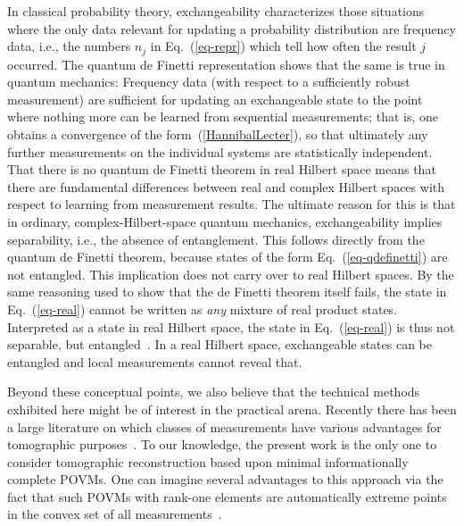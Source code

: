In classical probability theory, exchangeability characterizes
those situations where the only data relevant for updating a
probability distribution are frequency data, i.e., the numbers
$n_j$ in Eq.~(\ref{eq-repr}) which tell how often the result $j$
occurred. The quantum de Finetti representation shows that the
same is true in quantum mechanics:  Frequency data (with respect
to a sufficiently robust measurement) are sufficient for updating
an exchangeable state to the point where nothing more can be
learned from sequential measurements; that is, one obtains a
convergence of the form~(\ref{HannibalLecter}), so that ultimately
any further measurements on the individual systems are
statistically independent. That there is no quantum de Finetti
theorem in real Hilbert space means that there are fundamental
differences between real and complex Hilbert spaces with respect
to learning from measurement results.  The ultimate reason for
this is that in ordinary, complex-Hilbert-space quantum mechanics,
exchangeability implies separability, i.e., the absence of
entanglement.  This follows directly from the quantum de Finetti
theorem, because states of the form Eq.~(\ref{eq-qdefinetti}) are
not entangled.  This implication does not carry over to real
Hilbert spaces.  By the same reasoning used to show that the de
Finetti theorem itself fails, the state in Eq.~(\ref{eq-real})
cannot be written as {\it any\/} mixture of real product states.
Interpreted as a state in real Hilbert space, the state in
Eq.~(\ref{eq-real}) is thus not separable, but
entangled~\cite{Caves2000}. In a real Hilbert space, exchangeable
states can be entangled and local measurements cannot reveal that.

Beyond these conceptual points, we also believe that the technical
methods exhibited here might be of interest in the practical arena.
Recently there has been a large literature on which classes of
measurements have various advantages for tomographic
purposes~\cite{QuorumLump,QuorumOld}.  To our knowledge, the present
work is the only one to consider tomographic reconstruction based
upon minimal informationally complete POVMs. One can imagine several
advantages to this approach via the fact that such POVMs with
rank-one elements are automatically extreme points in the convex set
of all measurements~\cite{Fujiwara1998}.

